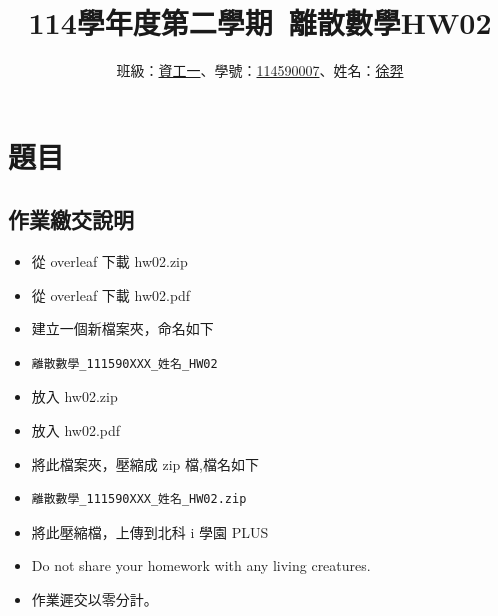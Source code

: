 \documentclass[sigconf]{acmart}
\begin{document}
\title{114學年度第二學期~離散數學HW02}

\author{班級：\underline{資工一}、學號：\underline{114590007}、姓名：\underline{徐羿}}
\orcid{}
\affiliation{%
  \institution{}
  \city{}
  \country{}
}

\maketitle

\section{題目}
\subsection{作業繳交說明}
\begin{shaded}
\begin{itemize}
    \item[-] 從 overleaf 下載 hw02.zip
    \item[-] 從 overleaf 下載 hw02.pdf
    \item[-] 建立一個新檔案夾，命名如下
    \item[-] \color{red}\begin{verbatim}離散數學_111590XXX_姓名_HW02\end{verbatim}\color{black}
    \item[-] 放入 hw02.zip
    \item[-] 放入 hw02.pdf
    \item[-] 將此檔案夾，壓縮成 zip 檔,檔名如下
    \item[-] \color{red}\begin{verbatim}離散數學_111590XXX_姓名_HW02.zip\end{verbatim}\color{black}
    \item[-] 將此壓縮檔，上傳到北科 i 學園 PLUS
    \item[-] Do not share your homework with any living creatures.
    \item[-] 作業遲交以零分計。
\end{itemize}
\end{shaded}


\end{document}

